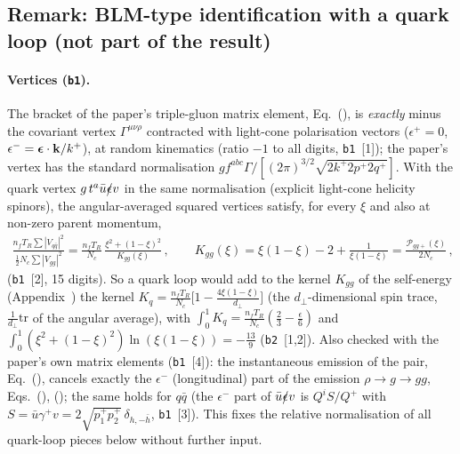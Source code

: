 \subsection{Remark: BLM-type identification with a quark loop (not part of the result)}\label{sec:b-blm}

\paragraph{Vertices (\texttt{b1}).} The bracket of the paper's triple-gluon matrix element, Eq.~(), is \emph{exactly} minus the covariant vertex $\Gamma^{\mu\nu\rho}$ contracted with light-cone polarisation vectors ($\epsilon^+=0$, $\epsilon^-=\boldsymbol\epsilon\cdot\mathbf{k}/k^+$), at random kinematics (ratio $-1$ to all digits, \texttt{b1}~[1]); the paper's vertex has the standard normalisation $gf^{abc}\Gamma/[(2\pi)^{3/2}\sqrt{2k^+2p^+2q^+}]$. With the quark vertex $g\,t^a\bar u\slashed\epsilon v$ in the same normalisation (explicit light-cone helicity spinors), the angular-averaged squared vertices satisfy, for every $\xi$ and also at non-zero parent momentum,
\begin{align}
\frac{n_fT_R\sum|V_{q\bar q}|^2}{\frac12N_c\sum|V_{gg}|^2}=\frac{n_fT_R}{N_c}\,\frac{\xi^2+(1-\xi)^2}{K_{gg}(\xi)}\,,\qquad K_{gg}(\xi)=\xi(1-\xi)-2+\frac{1}{\xi(1-\xi)}=\frac{\mathcal P_{gg+}(\xi)}{2N_c}\,,
\end{align}
(\texttt{b1}~[2], 15 digits). So a quark loop would add to the kernel $K_{gg}$ of the self-energy (Appendix~) the kernel $K_q=\frac{n_fT_R}{N_c}\big[1-\frac{4\xi(1-\xi)}{d_\perp}\big]$ (the $d_\perp$-dimensional spin trace, $\frac{1}{d_\perp}\mathrm{tr}$ of the angular average), with $\int_0^1K_q=\frac{n_fT_R}{N_c}(\frac23-\frac\epsilon6)$ and $\int_0^1(\xi^2+(1-\xi)^2)\ln(\xi(1-\xi))=-\frac{13}{9}$ (\texttt{b2}~[1,2]). Also checked with the paper's own matrix elements (\texttt{b1}~[4]): the instantaneous emission of the pair, Eq.~(), cancels exactly the $\epsilon^-$ (longitudinal) part of the emission $\rho\to g\to gg$, Eqs.~(), (); the same holds for $q\bar q$ (the $\epsilon^-$ part of $\bar u\slashed\epsilon v$ is $Q^iS/Q^+$ with $S=\bar u\gamma^+v=2\sqrt{p_1^+p_2^+}\,\delta_{h,-\bar h}$, \texttt{b1}~[3]). This fixes the relative normalisation of all quark-loop pieces below without further input.

